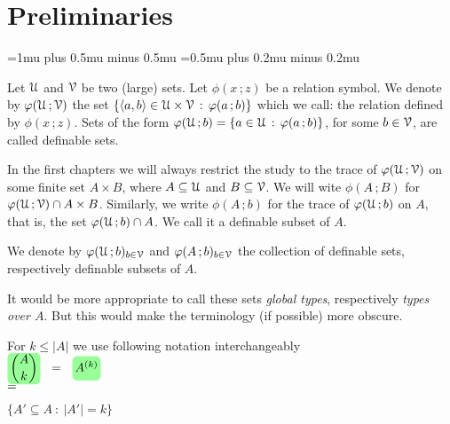 \documentclass[scombinatorics.tex]{subfiles}
\begin{document}
\chapter*{Preliminaries}

\label{minimax}


\def\medrel#1{\parbox[t]{6ex}{$\displaystyle\hfil #1$}}
\def\ceq#1#2#3{\parbox[t]{25ex}{$\displaystyle #1$}\medrel{#2}{$\displaystyle #3$}}

\thickmuskip=1mu plus 0.5mu minus 0.5mu
\medmuskip=0.5mu plus 0.2mu minus 0.2mu

Let $\EuScript U$ and $\EuScript V$ be two (large) sets.
Let $\phi(x\,;z)$ be a relation symbol.
We denote by $\varphi(\EuScript U\,;\EuScript V)$ the set $\{\langle a,b\rangle\in\EuScript U\times\EuScript V\, :\, \varphi(a\,;b)\}$ which we call: the relation defined by $\phi(x\,;z)$.
Sets of the form $\varphi(\EuScript U\,;b)=\{a\in\EuScript U\,:\, \varphi(a\,;b)\}$, for some $b\in\EuScript V$, are called definable sets.


In the first chapters we will always restrict the study to the trace of $\varphi(\EuScript U\,;\EuScript V)$ on some finite set $A\times B$, where $A\subseteq\EuScript U$ and $B\subseteq\EuScript V$. 
We will wite $\phi(A\,;B)$ for $\varphi(\EuScript U\,;\EuScript V)\cap A\times B$.
Similarly, we write $\phi(A\,;b)$ for the trace of $\varphi(\EuScript U\,;b)$ on $A$, that is, the set $\varphi(\EuScript U\,;b)\cap A$.
We call it a definable subset of $A$.

We denote by \emph{$\varphi(\EuScript U\,;b)_{b\in\EuScript V}$} and \emph{$\varphi(A\,;b)_{b\in\EuScript V}$} the collection of definable sets, respectively definable subsets of $A$.

It would be more appropriate to call these sets \textit{global types}, respectively \textit{types over $A$}.
But this would make the terminology (if possible) more obscure.

For $k\le|A|$ we use following notation interchangeably

\ceq{\hfill\emph{$\displaystyle{A\choose k}$}\medrel{=}\emph{$\vphantom{\Big[}A^{(k)}$}}
{=}
{\Big\{A'\subseteq A\ :\ |A'|=k \Big\}}
\end{document}
